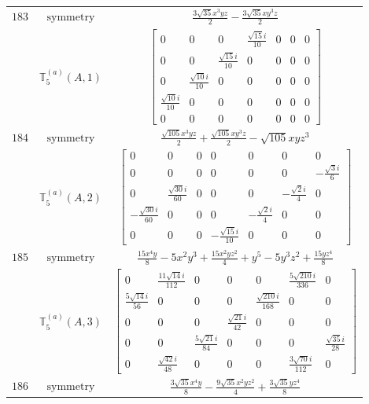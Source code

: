 \documentclass[fleqn,8pt,landscape]{jsarticle}
\begin{document}
\begin{longtable}{ccc}
$ 183 $ & $ \text{symmetry} $ & $ \frac{3 \sqrt{35} x^{3} y z}{2} - \frac{3 \sqrt{35} x y^{3} z}{2} $ \\
$  $ & $ \mathbb{T}_{5}^{(a)}(A,1) $ & $ \begin{bmatrix} 0 & 0 & 0 & \frac{\sqrt{15} i}{10} & 0 & 0 & 0 \\ 0 & 0 & \frac{\sqrt{15} i}{10} & 0 & 0 & 0 & 0 \\ 0 & \frac{\sqrt{10} i}{10} & 0 & 0 & 0 & 0 & 0 \\ \frac{\sqrt{10} i}{10} & 0 & 0 & 0 & 0 & 0 & 0 \\ 0 & 0 & 0 & 0 & 0 & 0 & 0 \end{bmatrix} $ \\ \hline
$ 184 $ & $ \text{symmetry} $ & $ \frac{\sqrt{105} x^{3} y z}{2} + \frac{\sqrt{105} x y^{3} z}{2} - \sqrt{105} x y z^{3} $ \\
$  $ & $ \mathbb{T}_{5}^{(a)}(A,2) $ & $ \begin{bmatrix} 0 & 0 & 0 & 0 & 0 & 0 & 0 \\ 0 & 0 & 0 & 0 & 0 & 0 & - \frac{\sqrt{3} i}{6} \\ 0 & \frac{\sqrt{30} i}{60} & 0 & 0 & 0 & - \frac{\sqrt{2} i}{4} & 0 \\ - \frac{\sqrt{30} i}{60} & 0 & 0 & 0 & - \frac{\sqrt{2} i}{4} & 0 & 0 \\ 0 & 0 & 0 & - \frac{\sqrt{15} i}{10} & 0 & 0 & 0 \end{bmatrix} $ \\ \hline
$ 185 $ & $ \text{symmetry} $ & $ \frac{15 x^{4} y}{8} - 5 x^{2} y^{3} + \frac{15 x^{2} y z^{2}}{4} + y^{5} - 5 y^{3} z^{2} + \frac{15 y z^{4}}{8} $ \\
$  $ & $ \mathbb{T}_{5}^{(a)}(A,3) $ & $ \begin{bmatrix} 0 & \frac{11 \sqrt{14} i}{112} & 0 & 0 & 0 & \frac{5 \sqrt{210} i}{336} & 0 \\ \frac{5 \sqrt{14} i}{56} & 0 & 0 & 0 & \frac{\sqrt{210} i}{168} & 0 & 0 \\ 0 & 0 & 0 & \frac{\sqrt{21} i}{42} & 0 & 0 & 0 \\ 0 & 0 & \frac{5 \sqrt{21} i}{84} & 0 & 0 & 0 & \frac{\sqrt{35} i}{28} \\ 0 & \frac{\sqrt{42} i}{48} & 0 & 0 & 0 & \frac{3 \sqrt{70} i}{112} & 0 \end{bmatrix} $ \\ \hline
$ 186 $ & $ \text{symmetry} $ & $ \frac{3 \sqrt{35} x^{4} y}{8} - \frac{9 \sqrt{35} x^{2} y z^{2}}{4} + \frac{3 \sqrt{35} y z^{4}}{8} $ \\

\end{longtable}
\end{document}
